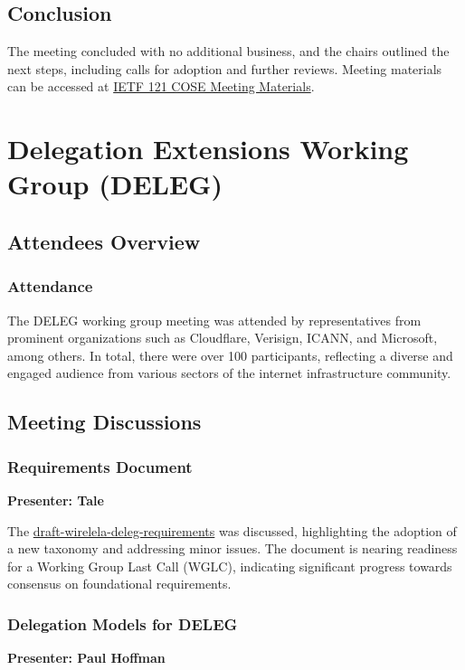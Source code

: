 \documentclass{article}
\begin{document}
\subsection{Conclusion}

The meeting concluded with no additional business, and the chairs outlined the next steps, including calls for adoption and further reviews. Meeting materials can be accessed at \href{https://datatracker.ietf.org/meeting/121/session/cose}{IETF 121 COSE Meeting Materials}.



\newpage

\section{Delegation Extensions Working Group (DELEG)}

\subsection{Attendees Overview}
\subsubsection{Attendance}
The DELEG working group meeting was attended by representatives from prominent organizations such as Cloudflare, Verisign, ICANN, and Microsoft, among others. In total, there were over 100 participants, reflecting a diverse and engaged audience from various sectors of the internet infrastructure community.

\subsection{Meeting Discussions}

\subsubsection{Requirements Document}
\textbf{Presenter: Tale}

The \href{https://datatracker.ietf.org/doc/draft-wirelela-deleg-requirements/}{draft-wirelela-deleg-requirements} was discussed, highlighting the adoption of a new taxonomy and addressing minor issues. The document is nearing readiness for a Working Group Last Call (WGLC), indicating significant progress towards consensus on foundational requirements.

\subsubsection{Delegation Models for DELEG}
\textbf{Presenter: Paul Hoffman}
\end{document}
